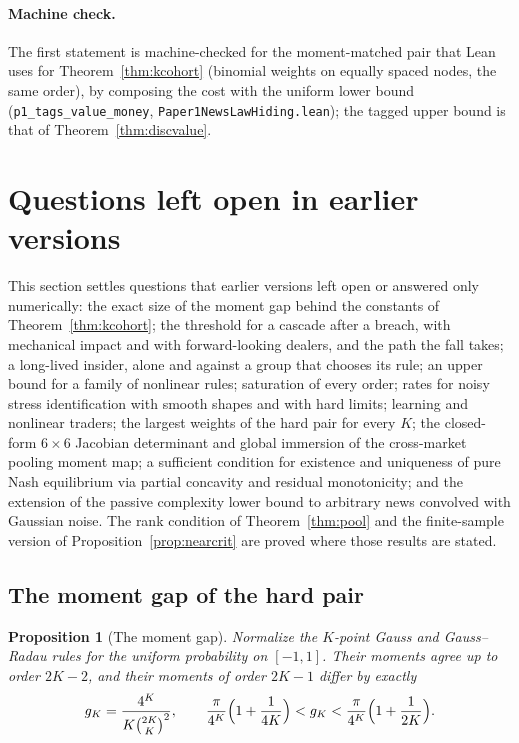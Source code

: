 \documentclass[12pt]{article}
\newtheorem{proposition}[theorem]{Proposition}
\theoremstyle{definition}
\theoremstyle{remark}
\begin{document}
\paragraph{Machine check.} The first statement is machine-checked for the moment-matched pair that Lean uses for Theorem~\ref{thm:kcohort} (binomial weights on equally spaced nodes, the same order), by composing the cost with the uniform lower bound (\texttt{p1\_tags\_value\_money}, \nolinkurl{Paper1NewsLawHiding.lean}); the tagged upper bound is that of Theorem~\ref{thm:discvalue}.

\section{Questions left open in earlier versions}\label{app:openres}

This section settles questions that earlier versions left open or answered only numerically: the exact size of the moment gap behind the constants of Theorem~\ref{thm:kcohort}; the threshold for a cascade after a breach, with mechanical impact and with forward-looking dealers, and the path the fall takes; a long-lived insider, alone and against a group that chooses its rule; an upper bound for a family of nonlinear rules; saturation of every order; rates for noisy stress identification with smooth shapes and with hard limits; learning and nonlinear traders; the largest weights of the hard pair for every $K$; the closed-form $6\times6$ Jacobian determinant and global immersion of the cross-market pooling moment map; a sufficient condition for existence and uniqueness of pure Nash equilibrium via partial concavity and residual monotonicity; and the extension of the passive complexity lower bound to arbitrary news convolved with Gaussian noise. The rank condition of Theorem~\ref{thm:pool} and the finite-sample version of Proposition~\ref{prop:nearcrit} are proved where those results are stated.

\subsection{The moment gap of the hard pair}

\begin{proposition}[The moment gap]\label{prop:gap}
Normalize the $K$-point Gauss and Gauss--Radau rules for the uniform probability on $[-1,1]$. Their moments agree up to order $2K-2$, and their moments of order $2K-1$ differ by exactly
\[
g_K=\frac{4^K}{K\binom{2K}{K}^2},\qquad \frac{\pi}{4^K}\Bigl(1+\frac1{4K}\Bigr)<g_K<\frac{\pi}{4^K}\Bigl(1+\frac1{2K}\Bigr).
\]
\end{proposition}
\end{document}
